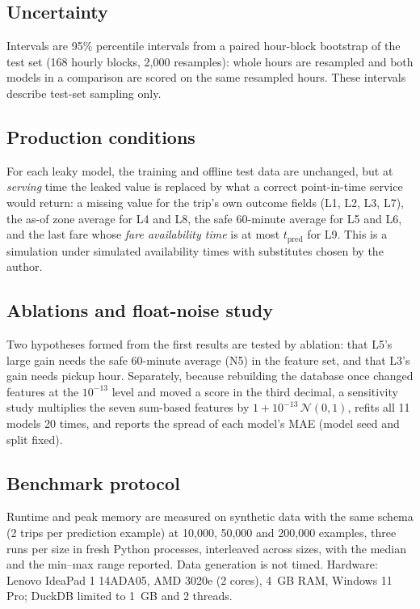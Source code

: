 \documentclass[11pt,a4paper]{article}
\newcommand{\tpred}{$t_{\mathrm{pred}}$}
\begin{document}
\subsection{Uncertainty}
Intervals are 95\% percentile intervals from a paired hour-block bootstrap of the test set (168 hourly blocks, 2{,}000 resamples): whole hours are resampled and both models in a comparison are scored on the same resampled hours. These intervals describe test-set sampling only.

\subsection{Production conditions}
For each leaky model, the training and offline test data are unchanged, but at \emph{serving} time the leaked value is replaced by what a correct point-in-time service would return: a missing value for the trip's own outcome fields (L1, L2, L3, L7), the as-of zone average for L4 and L8, the safe 60-minute average for L5 and L6, and the last fare whose \emph{fare availability time} is at most \tpred{} for L9. This is a simulation under simulated availability times with substitutes chosen by the author.

\subsection{Ablations and float-noise study}
Two hypotheses formed from the first results are tested by ablation: that L5's large gain needs the safe 60-minute average (N5) in the feature set, and that L3's gain needs pickup hour. Separately, because rebuilding the database once changed features at the $10^{-13}$ level and moved a score in the third decimal, a sensitivity study multiplies the seven sum-based features by $1+10^{-13}\,\mathcal N(0,1)$, refits all 11 models 20 times, and reports the spread of each model's MAE (model seed and split fixed).

\subsection{Benchmark protocol}
Runtime and peak memory are measured on synthetic data with the same schema (2 trips per prediction example) at 10{,}000, 50{,}000 and 200{,}000 examples, three runs per size in fresh Python processes, interleaved across sizes, with the median and the min--max range reported. Data generation is not timed. Hardware: Lenovo IdeaPad 1 14ADA05, AMD 3020e (2 cores), 4~GB RAM, Windows 11 Pro; DuckDB limited to 1~GB and 2 threads.
\end{document}
